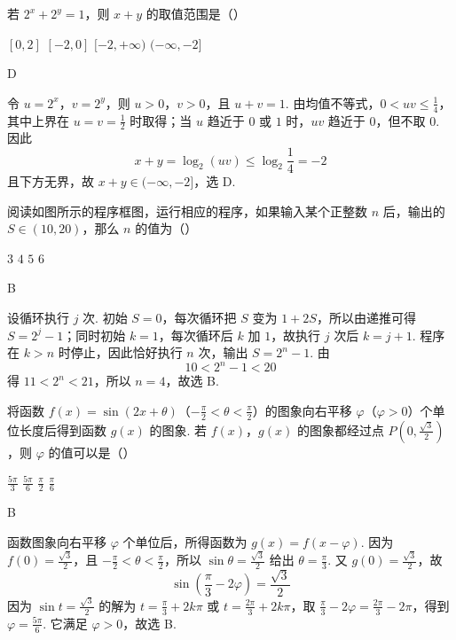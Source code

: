 \begin{problem}
若 \(2^{x} + 2^{y} = 1\)，则 \(x + y\) 的取值范围是（\quad）

\choices
    {\([0,2]\)}
    {\([-2,0]\)}
    {\([-2, +\infty)\)}
    {\((- \infty, -2]\)}
\begin{answer}
D
\end{answer}

\begin{solution}
令 \(u=2^x\)，\(v=2^y\)，则 \(u>0\)，\(v>0\)，且 \(u+v=1\). 由均值不等式，\(0<uv\leqslant\frac14\)，其中上界在 \(u=v=\frac12\) 时取得；当 \(u\) 趋近于 \(0\) 或 \(1\) 时，\(uv\) 趋近于 \(0\)，但不取 \(0\). 因此
\[
x+y=\log_2(uv)\leqslant\log_2\frac14=-2
\]
且下方无界，故 \(x+y\in(-\infty,-2]\)，选 D.
\end{solution}
\end{problem}

\begin{problem}
阅读如图所示的程序框图，运行相应的程序，如果输入某个正整数 \(n\) 后，输出的 \(S \in (10, 20)\)，那么 \(n\) 的值为（\quad）


\choices
    {\(3\)}
    {\(4\)}
    {\(5\)}
    {\(6\)}
\begin{answer}
B
\end{answer}

\begin{solution}
设循环执行 \(j\) 次. 初始 \(S=0\)，每次循环把 \(S\) 变为 \(1+2S\)，所以由递推可得 \(S=2^j-1\)；同时初始 \(k=1\)，每次循环后 \(k\) 加 \(1\)，故执行 \(j\) 次后 \(k=j+1\). 程序在 \(k>n\) 时停止，因此恰好执行 \(n\) 次，输出 \(S=2^n-1\). 由
\[
10<2^n-1<20
\]
得 \(11<2^n<21\)，所以 \(n=4\)，故选 B.
\end{solution}
\end{problem}

\begin{problem}
将函数 \( f(x) = \sin (2x + \theta)\)（\(-\frac{\pi}{2} < \theta < \frac{\pi}{2}\)）的图象向右平移 \(\varphi\)（\(\varphi > 0\)）个单位长度后得到函数 \( g(x) \) 的图象. 若 \(f(x)\)，\(g(x) \) 的图象都经过点 \( P\left(0, \frac{\sqrt{3}}{2}\right) \)，则 \(\varphi\) 的值可以是（\quad）

\choices
    {\(\frac{5\pi}{3}\)}
    {\( \frac{5\pi}{6} \)}
    {\( \frac{\pi}{2} \)}
    {\(\frac{\pi}{6}\)}
\begin{answer}
B
\end{answer}

\begin{solution}
函数图象向右平移 \(\varphi\) 个单位后，所得函数为 \(g(x)=f(x-\varphi)\). 因为 \(f(0)=\frac{\sqrt{3}}2\)，且 \(-\frac\pi2<\theta<\frac\pi2\)，所以 \(\sin\theta=\frac{\sqrt{3}}2\) 给出 \(\theta=\frac\pi3\). 又 \(g(0)=\frac{\sqrt{3}}2\)，故
\[
\sin\left(\frac\pi3-2\varphi\right)=\frac{\sqrt{3}}2
\]
因为 \(\sin t=\frac{\sqrt3}{2}\) 的解为 \(t=\frac\pi3+2k\pi\) 或 \(t=\frac{2\pi}3+2k\pi\)，取 \(\frac\pi3-2\varphi=\frac{2\pi}3-2\pi\)，得到 \(\varphi=\frac{5\pi}{6}\). 它满足 \(\varphi>0\)，故选 B.
\end{solution}
\end{problem}


